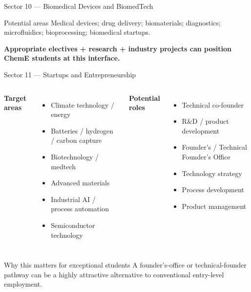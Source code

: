 \documentclass[aspectratio=169,11pt]{beamer}
\newcommand{\key}[1]{\textbf{\color{IITblue}#1}}
\begin{document}
\begin{frame}{Sector 10 — Biomedical Devices and BiomedTech}
\begin{block}{Potential areas}
Medical devices; drug delivery; biomaterials; diagnostics; microfluidics; bioprocessing; biomedical startups.
\end{block}
\vspace{5mm}
\begin{center}
\end{center}
\vspace{4mm}
\centering\key{Appropriate electives + research + industry projects can position ChemE students at this interface.}
\end{frame}

\begin{frame}{Sector 11 — Startups and Entrepreneurship}
\begin{columns}[T]
\textbf{Target areas}
\begin{itemize}
\item Climate technology / energy
\item Batteries / hydrogen / carbon capture
\item Biotechnology / medtech
\item Advanced materials
\item Industrial AI / process automation
\item Semiconductor technology
\end{itemize}
\textbf{Potential roles}
\begin{itemize}
\item Technical co-founder
\item R\&D / product development
\item Founder's / Technical Founder's Office
\item Technology strategy
\item Process development
\item Product management
\end{itemize}
\end{columns}
\vspace{4mm}
\begin{block}{Why this matters for exceptional students}
A founder's-office or technical-founder pathway can be a highly attractive alternative to conventional entry-level employment.
\end{block}
\end{frame}
\end{document}
